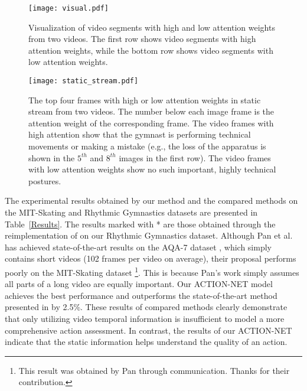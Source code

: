 \documentclass[sigconf]{acmart}
\begin{document}
\begin{figure*}[htb]
 \centering
 \texttt{[image: visual.pdf]}
 \vspace{-0.3cm}
\caption{Visualization of video segments with high and low attention weights from two videos. The first row shows video segments with high attention weights, while the bottom row shows video segments with low attention weights. 
}
 \label{fig:visual}
\vspace{-0.3cm}
\end{figure*}

\begin{figure*}[htb]
 \centering
 \texttt{[image: static\_stream.pdf]}
 \vspace{-0.3cm}
\caption{The top four frames with high or low attention weights in static stream from two videos. The number below each image frame is the attention weight of the corresponding frame. The video frames with high attention show that the gymnast is performing technical movements or making a mistake (e.g., the loss of the apparatus is shown in the $5^{th}$ and $8^{th}$ images in the first row). The video frames with low attention weights show no such important, highly technical postures.}
\vspace{-0.3cm}
 \label{fig:static stream}
\end{figure*}


The experimental results obtained by our method and the compared methods on the MIT-Skating and Rhythmic Gymnastics datasets are presented in Table~\ref{Results}. The results marked with * are those obtained through the reimplementation of \cite{parmar2017learning,xu2019learning} on our Rhythmic Gymnastics dataset. Although Pan et al. \cite{pan2019action} has achieved state-of-the-art results on the AQA-7 dataset \cite{parmar2019action}, which simply contains short videos (102 frames per video on average), their proposal performs poorly on the MIT-Skating dataset \footnote{This result was obtained by Pan through communication. Thanks for their contribution.}. This is because Pan's work simply assumes all parts of a long video are equally important. Our ACTION-NET model achieves the best performance and outperforms the state-of-the-art method presented in \cite{xu2019learning} by 2.5\%. These results of compared methods clearly demonstrate that only utilizing video temporal information is insufficient to model a more comprehensive action assessment. In contrast, the results of our ACTION-NET indicate that the static information helps understand the quality of an action.
\end{document}
